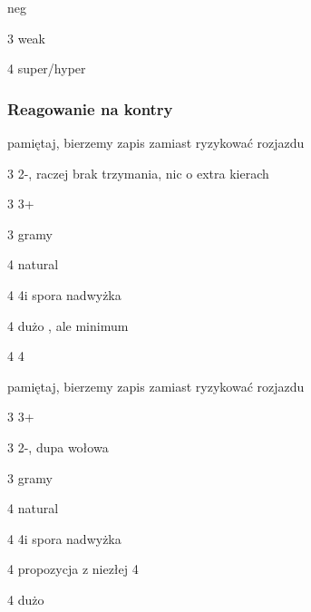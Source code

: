 \documentclass[12pt, a4paper]{article}
\begin{document}
\compsequence{{1\spades}{3\hearts}}
\begin{compoptions}[3]
  \item[\dbl] neg
  \item[3\spades] weak
  \item[4\minor] super/hyper 
\end{compoptions}

\subsubsection*{Reagowanie na kontry}
\begin{compoptions}[1]
  \item[\pass] pamiętaj, bierzemy zapis zamiast ryzykować rozjazdu
  \item[3\hearts] 2-\spades, raczej brak trzymania, nic o extra kierach
  \item[3\spades] 3+\spades
  \item[3\nt] gramy
  \item[4\clubs] natural
  \item[4\diams] 4\spades i spora nadwyżka
  \item[4\hearts] dużo \hearts, ale minimum      
  \item[4\spades] 4\spades
\end{compoptions}

\begin{compoptions}[1]
  \item[\pass] pamiętaj, bierzemy zapis zamiast ryzykować rozjazdu
  \item[3\hearts] 3+\hearts
  \item[3\spades] 2-\hearts, dupa wołowa
  \item[3\nt] gramy
  \item[4\clubs] natural
  \item[4\diams] 4\spades i spora nadwyżka
  \item[4\hearts] propozycja z niezłej 4   
  \item[4\spades] dużo \spades
\end{compoptions}
\end{document}

